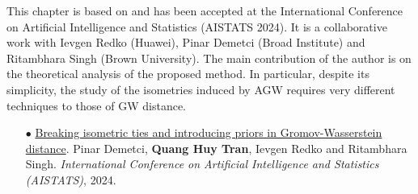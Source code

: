 This chapter is based on \citep{Demetci23} and has been accepted at the
International Conference on Artificial Intelligence and Statistics (AISTATS 2024).
It is a collaborative work with Ievgen Redko (Huawei), Pinar Demetci (Broad Institute)
and Ritambhara Singh (Brown University). The main contribution of the author is on the
theoretical analysis of the proposed method. In particular, despite its simplicity,
the study of the isometries induced by AGW requires very different techniques
to those of GW distance.

\begin{itemize}
    \item[$\bullet$] \ul{Breaking isometric ties and introducing priors in Gromov-Wasserstein distance}.
    Pinar Demetci, \textbf{Quang Huy Tran}, Ievgen Redko and Ritambhara Singh.
    \textit{International Conference on Artificial Intelligence and Statistics (AISTATS)}, 2024.
\end{itemize}